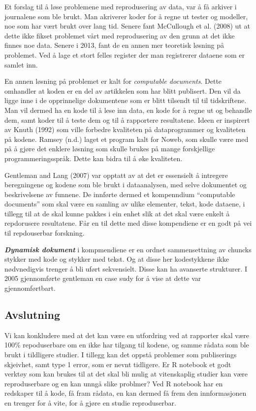 \documentclass[
  12pt,
]{article}
\begin{document}
Et forslag til å løse problemene med reprodusering av data, var å få
arkiver i journalene som ble brukt. Man akriverer koder for å regne ut
tester og modeller, noe som har vært brukt over lang tid. Senere fant
McCullough et al. (2008) ut at dette ikke fikset problemet vårt med
reprodusering av den grunn at det ikke finnes noe data. Senere i 2013,
fant de en annen mer teoretisk løsning på problemet. Ved å lage et stort
felles register der man registrerer dataene som er samlet inn.

En annen løsning på problemet er kalt for \emph{computable documents}.
Dette omhandler at koden er en del av artikkelen som har blitt
publisert. Den vil da ligge inne i de opprinnelige dokumentene som er
blitt tilsendt til til tidskriftene. Man vil dermed ha en kode til å
lese inn data, en kode for å regne ut og behandle dem, samt koder til å
teste dem og til å rapportere resultatene. Ideen er inspirert av Knuth
(1992) som ville forbedre kvaliteten på dataprogrammer og kvaliteten på
kodene. Ramsey (n.d.) laget et program kalt for Noweb, som skulle være
med på å gjøre det enklere løsning som skulle brukes på mange
forskjellige programmeringsspråk. Dette kan bidra til å øke kvaliteten.

Gentleman and Lang (2007) var opptatt av at det er essensielt å
intregere beregningene og kodene som ble brukt i dataanalysen, med selve
dokumentet og beskrivelsene av funnene. De innførte dermed et
kompenndium ``computable documents'' som skal være en samling av ulike
elementer, tekst, kode dataene, i tillegg til at de skal kunne pakkes i
ein enhet slik at det skal være enkelt å repdorusere resultatene. Får en
til dette med disse kompendiene er en godt på vei til repdouserbar
forskning.

\textbf{\emph{Dynamisk dokument}} i kompmendiene er en ordnet
sammensettning av chuncks stykker med kode og stykker med tekst. Og at
disse her kodestykkene ikke nødvnedigvis trenger å bli uført
sekvensielt. Disse kan ha avanserte strukturer. I 2005 gjennomførte
gentleman en case sudy for å vise at dette var gjennomførtbart.

\hypertarget{avslutning}{%
\subsection{Avslutning}\label{avslutning}}

Vi kan konkludere med at det kan være en utfordring ved at rapporter
skal være 100\% repoduserbare om en ikke har tilgang til kodene, og
samme rådata som ble brukt i tildligere studier. I tillegg kan det
oppstå problemer som publiserings skjeivhet, samt type 1 error, som er
nevnt tidligere. Er R notebook et godt verktøy som kan brukes til at det
skal bli mulig at vitenskaplig studier kan være reproduserbare og en kan
unngå slike problmer? Ved R notebook har en redskaper til å kode, få
fram rådata, en kan dermed få frem den innformasjonen en trenger for å
vite, for å gjøre en studie reproduserbar.
\end{document}

